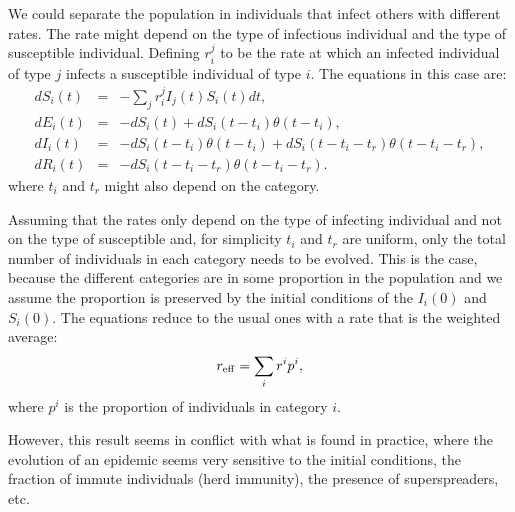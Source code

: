 \documentclass[a4paper,oneside,11pt]{article}
\begin{document}
We could separate the population in individuals that infect others with different rates. The rate might depend on the type of infectious individual and the type of susceptible individual. Defining $r^{j}_{i}$ to be the rate at which an infected individual of type $j$ infects a susceptible individual of type $i$. The equations in this case are:
\begin{eqnarray}
d S_i(t) &=& - \sum_j r^j_{i}  I_j(t) S_i(t) dt, \nonumber\\
d E_i(t) &=& -d S_i(t) + d S_i(t-t_i) \theta(t-t_i) ,\nonumber\\
d I_i(t) &=& -d S_i(t-t_i) \theta(t-t_i)+ d S_i(t-t_i-t_r) \theta(t-t_i-t_r),\nonumber\\
d R_i(t) &=& - d S_i(t - t_i - t_r) \theta(t-t_i-t_r).\nonumber
\end{eqnarray}
where $t_i$ and $t_r$ might also depend on the category.

Assuming that the rates only depend on the type of infecting individual and not on the type of susceptible and, for simplicity $t_i$ and $t_r$ are uniform, only the total number of individuals in each category needs to be evolved. This is the case, because the different categories are in some proportion in the population and we assume the proportion is preserved by
 the initial conditions of the $I_i(0)$ and $S_i(0)$. The equations reduce to the usual ones with a rate that is the weighted average:
 \begin{eqnarray}
 r_{\rm eff} = \sum_i r^i p^i,
 \end{eqnarray}
 where $p^i$ is the proportion of individuals in category $i$.

 However, this result seems in conflict with what is found in practice, where the evolution of an epidemic seems very sensitive to the initial conditions, the fraction of immute individuals (herd immunity), the presence of superspreaders, etc.
\end{document}
